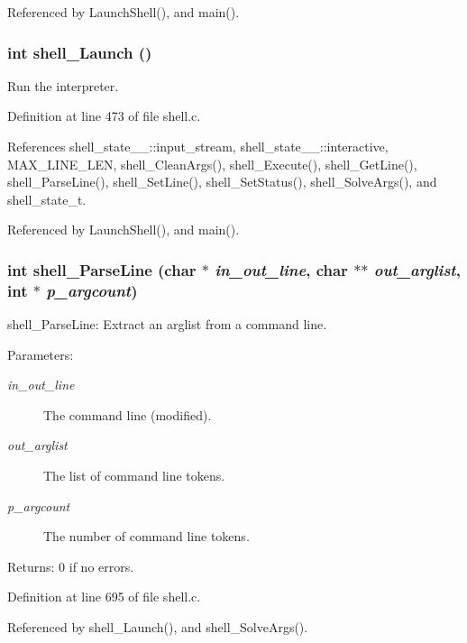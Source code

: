 Referenced by Launch\-Shell(), and main().
\subsubsection{\setlength{\rightskip}{0pt plus 5cm}int shell\_\-Launch ()}\label{shell_8h_a9}


Run the interpreter. 

Definition at line 473 of file shell.c.

References shell\_\-state\_\-\_\-::input\_\-stream, shell\_\-state\_\-\_\-::interactive, MAX\_\-LINE\_\-LEN, shell\_\-Clean\-Args(), shell\_\-Execute(), shell\_\-Get\-Line(), shell\_\-Parse\-Line(), shell\_\-Set\-Line(), shell\_\-Set\-Status(), shell\_\-Solve\-Args(), and shell\_\-state\_\-t.

Referenced by Launch\-Shell(), and main().
\subsubsection{\setlength{\rightskip}{0pt plus 5cm}int shell\_\-Parse\-Line (char $\ast$ {\em in\_\-out\_\-line}, char $\ast$$\ast$ {\em out\_\-arglist}, int $\ast$ {\em p\_\-argcount})}\label{shell_8h_a11}


shell\_\-Parse\-Line: Extract an arglist from a command line.

\begin{Desc}
\item[Parameters:]
\begin{description}
\item[{\em in\_\-out\_\-line}]The command line (modified). \item[{\em out\_\-arglist}]The list of command line tokens. \item[{\em p\_\-argcount}]The number of command line tokens.\end{description}
\end{Desc}
\begin{Desc}
\item[Returns:]0 if no errors. \end{Desc}


Definition at line 695 of file shell.c.

Referenced by shell\_\-Launch(), and shell\_\-Solve\-Args().

